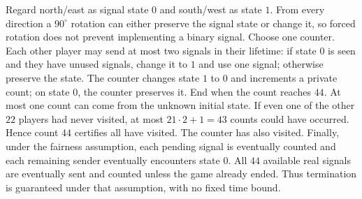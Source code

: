 Regard north/east as signal state $0$ and south/west as state $1$. From every direction a $90^\circ$ rotation can either preserve the signal state or change it, so forced rotation does not prevent implementing a binary signal.
Choose one counter. Each other player may send at most two signals in their lifetime: if state $0$ is seen and they have unused signals, change it to $1$ and use one signal; otherwise preserve the state. The counter changes state $1$ to $0$ and increments a private count; on state $0$, the counter preserves it. End when the count reaches $44$.
At most one count can come from the unknown initial state. If even one of the other $22$ players had never visited, at most $21\cdot2+1=43$ counts could have occurred. Hence count $44$ certifies all have visited. The counter has also visited. Finally, under the fairness assumption, each pending signal is eventually counted and each remaining sender eventually encounters state $0$. All $44$ available real signals are eventually sent and counted unless the game already ended. Thus termination is guaranteed under that assumption, with no fixed time bound.

